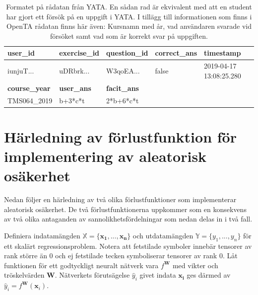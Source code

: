 \begin{table}[hbtp]
\begin{tabular}{|l|l|l|ll}
\hline
\textbf{user\_id}     & \textbf{exercise\_id} & \textbf{question\_id} & \multicolumn{1}{l|}{\textbf{correct\_ans}} & \multicolumn{1}{l|}{\textbf{timestamp}}      \\ \hline
iunjuT...  & uDRbrk...  & W3qoEA...  & \multicolumn{1}{l|}{false}                  & \multicolumn{1}{l|}{2019-04-17 13:08:25.280} \\ \hline
\textbf{course\_year} & \textbf{user\_ans}    & \textbf{facit\_ans}   &                                            &                                              \\ \cline{1-3}
TMS064\_2019          & b+3*c*t             & 2*b+6*c*t             &                                            &                                              \\ \cline{1-3}
\end{tabular}
\caption{Formatet på rådatan från YATA. En sådan rad är ekvivalent med att en student har gjort ett försök på en uppgift i YATA. I tillägg till informationen som finns i OpenTA rådatan finns här även: Kursnamn med år, vad användaren svarade vid försöket samt vad som är korrekt svar på uppgiften.}
\end{table}




\newpage

\section{Härledning av förlustfunktion för implementering av aleatorisk osäkerhet}
\label{app: derivation}
Nedan följer en härledning av två olika förlustfunktioner som implementerar aleatorisk osäkerhet. De två förlustfunktionerna uppkommer som en konsekvens av två olika antaganden av sannolikhetsfördelningar som nedan delas in i två fall.

Definiera indatamängden $\mathbb{X} = \{\mathbf{x_1},..., \mathbf{x_n}\}$ och utdatamängden $\mathbb{Y} = \{y_1,..., y_n\}$ för ett skalärt regressionsproblem. Notera att fetstilade symboler innebär tensorer av rank större än 0 och ej fetstilade tecken symboliserar tensorer av rank 0.  Låt funktionen för ett godtyckligt neuralt nätverk vara $f^\mathbf{W}$ med vikter och tröskelvärden $\mathbf{W}$. Nätverkets förutsägelse $\hat{y}_i$ givet indata $\mathbf{x_i}$ ges därmed av $\hat{y}_i = f^\mathbf{W}(\mathbf{x}_i)$.

